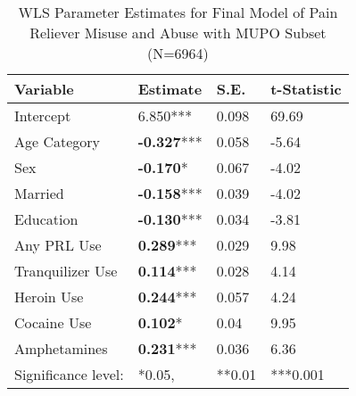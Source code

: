 \documentclass[sigconf]{acmart}
\begin{document}
\begin{table}
  \caption{WLS Parameter Estimates for Final Model of Pain Reliever Misuse and Abuse 
  with MUPO Subset (N=6964)}
  \label{tab:freq}
  \begin{tabular}{llll}
    \toprule
    Variable & Estimate& S.E.& t-Statistic \\
    \midrule
    Intercept& 6.850***& 0.098& 69.69 \\
    Age Category& \textbf{-0.327}***& 0.058& -5.64 \\
    Sex& \textbf{-0.170}*& 0.067& -4.02 \\
    Married& \textbf{-0.158}***& 0.039& -4.02 \\
    Education& \textbf{-0.130}***& 0.034& -3.81 \\
    Any PRL Use& \textbf{0.289}***& 0.029& 9.98 \\
    Tranquilizer Use& \textbf{0.114}***& 0.028& 4.14 \\
    Heroin Use& \textbf{0.244}***& 0.057& 4.24 \\
    Cocaine Use& \textbf{0.102}*& 0.04& 9.95 \\
    Amphetamines& \textbf{0.231}***& 0.036& 6.36 \\
    \bottomrule
    Significance level:& *0.05,& **0.01& ***0.001
  \end{tabular}
\end{table}

\end{document}
